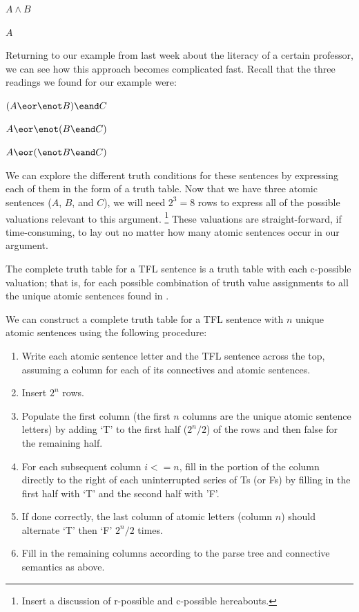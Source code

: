 \begin{argument}
  \item[\ephi] $A \wedge B$
  \item[\epsi] $A$
\end{argument}

Returning to our example from last week about the literacy of a certain professor,
we can see how this approach becomes complicated fast. Recall that the three
readings we found for our example were:

\begin{argument}
  \item[\ephi] $(A \eor \enot B) \eand C$
  \item[\epsi] $A \eor \enot (B \eand C)$
  \item[\echi] $A \eor (\enot B \eand C)$
\end{argument}

We can explore the different truth conditions for these sentences by expressing
each of them in the form of a truth table. Now that we have three atomic sentences
($A$, $B$, and $C$), we will need $2^3 = 8$ rows to express all of the possible
valuations relevant to this argument.
\footnote{Insert a discussion of r-possible and c-possible hereabouts.}
These valuations are straight-forward, if time-consuming, to lay out no matter how
many atomic sentences occur in our argument.

\begin{definition}
  The complete truth table for a TFL sentence \ephi is a truth table with each
  c-possible valuation; that is, for each possible combination of truth value
  assignments to all the unique atomic sentences found in \ephi.

  We can construct a complete truth table for a TFL sentence with $n$ unique atomic
  sentences using the following procedure:
  \begin{enumerate}
  \item Write each atomic sentence letter and the TFL sentence across the top,
    assuming a column for each of its connectives and atomic sentences.
  \item Insert $2^n$ rows.
  \item Populate the first column (the first $n$ columns are the unique atomic
    sentence letters) by adding `T' to the first half ($2^n/2$) of the rows and
    then false for the remaining half.
  \item For each subsequent column $i<=n$, fill in the portion of the column
    directly to the right of each uninterrupted series of Ts (or Fs) by filling
    in the first half with `T' and the second half with 'F'.
  \item If done correctly, the last column of atomic letters (column $n$) should
    alternate `T' then `F' $2^n/2$ times.
  \item Fill in the remaining columns according to the parse tree and connective
    semantics as above.
  \end{enumerate}

\end{definition}

